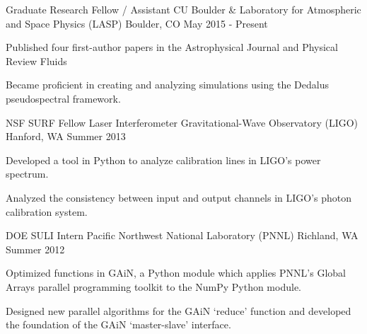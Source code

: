 

\begin{cventries}

  \cventry
    {Graduate Research Fellow / Assistant} %
    {CU Boulder \& Laboratory for Atmospheric and Space Physics (LASP)} %
    {Boulder, CO} %
    {May 2015 - Present} %
    {
      \begin{cvitems} %
	  	\item { Published four first-author papers in the Astrophysical Journal and Physical Review Fluids }
        \item { Became proficient in creating and analyzing simulations using the Dedalus pseudospectral framework. }
      \end{cvitems}
    }

  \cventry
    {NSF SURF Fellow} %
    {Laser Interferometer Gravitational-Wave Observatory (LIGO)} %
    {Hanford, WA} %
    {Summer 2013} %
    {
      \begin{cvitems} %
        \item {Developed a tool in Python to analyze calibration lines in LIGO's power spectrum.}
        \item {Analyzed the consistency between input and output channels in LIGO's photon calibration system.}
      \end{cvitems}
    }

  \cventry
    {DOE SULI Intern} %
    {Pacific Northwest National Laboratory (PNNL)} %
    {Richland, WA} %
    {Summer 2012} %
    {
      \begin{cvitems} %
        \item {Optimized functions in GAiN, a Python module which applies PNNL’s Global Arrays parallel
        programming toolkit to the NumPy Python module.}
        \item {Designed new parallel algorithms for the GAiN `reduce' function and developed the foundation of the GAiN `master-slave' interface.}
      \end{cvitems} 
    }


\end{cventries}
